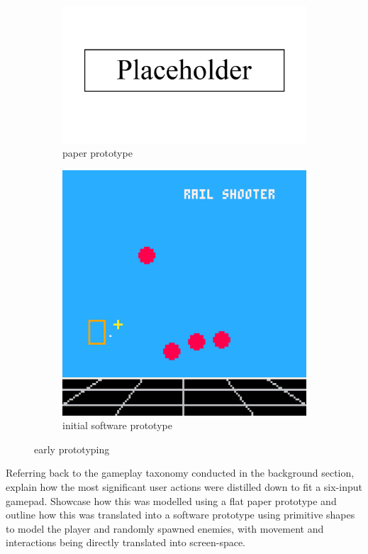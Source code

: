 \documentclass{article}
\begin{document}
\begin{figure}[h]
\begin{subfigure}{.5\textwidth}
  \centering
  \includegraphics[width=.8\linewidth]{placeholder}
  \caption{paper prototype}
  \label{fig:pfig1}
\end{subfigure}
\begin{subfigure}{.5\textwidth}
  \centering
  \includegraphics[width=.8\linewidth]{prototype2d}
  \caption{initial software prototype}
  \label{fig:pfig2}
\end{subfigure}
\caption{early prototyping}
\label{fig:gameprototype}
\end{figure}

Referring back to the gameplay taxonomy conducted in the background section, explain
how the most significant user actions were distilled down to fit a six-input
gamepad. Showcase how this was modelled using a flat paper prototype and outline
how this was translated into a software prototype using primitive shapes to model
the player and randomly spawned enemies, with movement and interactions being
directly translated into screen-space.
\end{document}
